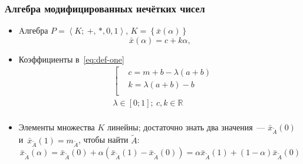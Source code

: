 \documentclass[12pt]{beamer}
\begin{document}

\begin{frame}
  \frametitle{Алгебра модифицированных нечётких чисел}
  \begin{itemize}
    \item Aлгебра $P=\left\langle K ;\ +,\,*, 0, 1 \right\rangle$, $K=\left\lbrace \bar x(\alpha) \right\rbrace$
      \begin{equation}
        \label{eq:def-one}
        \bar{x}\left( \alpha  \right)=c+k\alpha,
      \end{equation}
    \item Коэффициенты в~\eqref{eq:def-one}
      \begin{equation}
        \label{eq:modified-number-from-abm}
        \begin{aligned}
          & \left[ \begin{aligned}
          & c=m+b-\lambda \left( a+b \right) \\ 
          & k=\lambda \left( a+b \right)-b \\ 
        \end{aligned} \right. \\ 
        & \lambda \in \left[ 0;1 \right];\ c,k\in \mathbb{R} \\ 
      \end{aligned}
      \end{equation}
    \item Элементы множества $K$ линейны; достаточно знать два значения~--- $\bar{x}_{\tilde A}\left( 0 \right)$ и~$\bar{x}_{\tilde A}\left( 1 \right)=m_{\tilde A}$, чтобы найти $\tilde{A}$:
      \begin{equation}
        \label{eq:isomorphic-field}
        \bar{x}_{\tilde A}\left( \alpha \right)=\bar{x}_{\tilde A}\left( 0 \right)+\alpha \left(\bar{x}_{\tilde A}\left( 1 \right)-\bar{x}_{\tilde A}\left(0 \right) \right)=\alpha \bar{x}_{\tilde A}\left( 1 \right)+\left( 1-\alpha  \right) \bar{x}_{\tilde A}\left( 0 \right)
      \end{equation}
  \end{itemize}
\end{frame}

\end{document}

